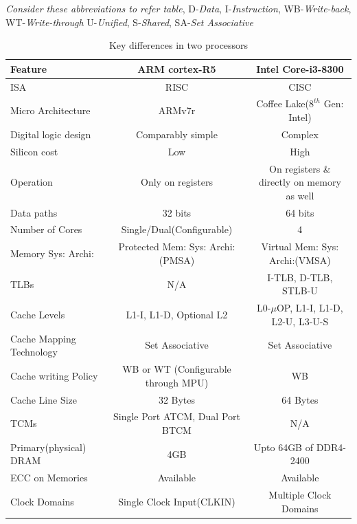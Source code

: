 \documentclass[a4paper,11pt]{article}
\begin{document}
{\footnotesize \textit{Consider these abbreviations to refer table},
	D-\textit{Data}, I-\textit{Instruction}, WB-\textit{Write-back}, WT-\textit{Write-through} U-\textit{Unified}, S-\textit{Shared}, SA-\textit{Set Associative}}

\begin{table}[!h]
	\centering
	\begin{tabular}{l ||c| c }
		\textbf{Feature} &\textbf{ARM cortex-R5}&\textbf{Intel Core-i3-8300}\\\hline
		ISA &RISC&CISC\\
		Micro Architecture &ARMv7r&Coffee Lake($8^{th}$ Gen: Intel)\\
		Digital logic design&	Comparably simple	&Complex\\
		Silicon cost&	Low	&High\\
		Operation	&Only on registers&	On registers \& directly on memory as well\\
		Data paths&	32 bits	&64 bits\\

		Number of Cores& Single/Dual(Configurable)&4\\
		Memory Sys: Archi:&Protected Mem: Sys: Archi:(PMSA)&Virtual Mem: Sys: Archi:(VMSA)\\
		TLBs&N/A&I-TLB, D-TLB, STLB-U\\
		Cache  Levels& L1-I, L1-D, Optional L2  & L0-$\mu$OP, L1-I,   L1-D, L2-U, L3-U-S\\
		Cache Mapping Technology&Set Associative&Set Associative\\
		Cache writing Policy&WB or WT (Configurable through MPU)& WB\\
		Cache Line Size&32 Bytes&64 Bytes\\
		TCMs&Single Port ATCM, Dual Port BTCM&N/A\\
		Primary(physical) DRAM& 4GB&Upto 64GB of DDR4-2400\\
		ECC on Memories& Available& Available\\
		Clock Domains& Single Clock Input(CLKIN)&Multiple Clock Domains\\


		\hline\hline
	\end{tabular}
	\caption{Key differences in two processors}
\end{table}





\end{document}
